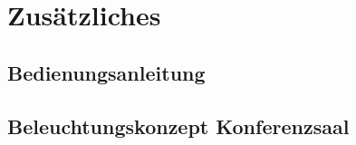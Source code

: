 \hypertarget{zusuxe4tzliches}{%
\section{Zusätzliches}\label{zusuxe4tzliches}}

\hypertarget{bedienungsanleitung}{%
\subsection{Bedienungsanleitung}\label{bedienungsanleitung}}

\hypertarget{beleuchtungskonzept-konferenzsaal}{%
\subsection{Beleuchtungskonzept
Konferenzsaal}\label{beleuchtungskonzept-konferenzsaal}}
